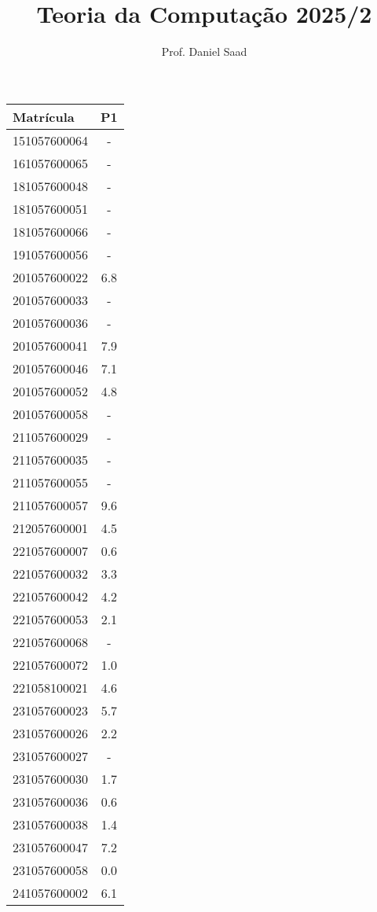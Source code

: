 \documentclass{article}
\title{ Teoria da Computação 2025/2}
\date{}
\author{ Prof. Daniel Saad}
\begin{document}
 \maketitle
    \begin{longtable}{|l|c|}
    \hline
Matrícula & P1\\\hline \endhead   
151057600064 & -\\\hline
161057600065 & -\\\hline
181057600048 & -\\\hline
181057600051 & -\\\hline
181057600066 & -\\\hline
191057600056 & -\\\hline
201057600022 & 6.8\\\hline
201057600033 & -\\\hline
201057600036 & -\\\hline
201057600041 & 7.9\\\hline
201057600046 & 7.1\\\hline
201057600052 & 4.8\\\hline
201057600058 & -\\\hline
211057600029 & -\\\hline
211057600035 & -\\\hline
211057600055 & -\\\hline
211057600057 & 9.6\\\hline
212057600001 & 4.5\\\hline
221057600007 & 0.6\\\hline
221057600032 & 3.3\\\hline
221057600042 & 4.2\\\hline
221057600053 & 2.1\\\hline
221057600068 & -\\\hline
221057600072 & 1.0\\\hline
221058100021 & 4.6\\\hline
231057600023 & 5.7\\\hline
231057600026 & 2.2\\\hline
231057600027 & -\\\hline
231057600030 & 1.7\\\hline
231057600036 & 0.6\\\hline
231057600038 & 1.4\\\hline
231057600047 & 7.2\\\hline
231057600058 & 0.0\\\hline
241057600002 & 6.1\\\hline

\end{longtable}
\end{document}
